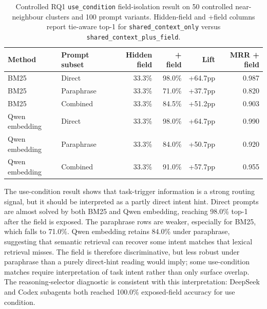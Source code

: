 \begin{table}[H]
\centering
\scriptsize
\setlength{\tabcolsep}{2pt}
\begin{tabular}{p{}p{}rrrr}
\toprule
Method & Prompt subset & Hidden field & + field & Lift & MRR + field \\
\midrule
BM25 & Direct & 33.3\% & 98.0\% & +64.7pp & 0.987 \\
BM25 & Paraphrase & 33.3\% & 71.0\% & +37.7pp & 0.820 \\
BM25 & Combined & 33.3\% & 84.5\% & +51.2pp & 0.903 \\
Qwen embedding & Direct & 33.3\% & 98.0\% & +64.7pp & 0.990 \\
Qwen embedding & Paraphrase & 33.3\% & 84.0\% & +50.7pp & 0.920 \\
Qwen embedding & Combined & 33.3\% & 91.0\% & +57.7pp & 0.955 \\
\bottomrule
\end{tabular}
\caption{Controlled RQ1 \texttt{use\_condition} field-isolation result on 50 controlled near-neighbour clusters and 100 prompt variants. Hidden-field and +field columns report tie-aware top-1 for \texttt{shared\_context\_only} versus \texttt{shared\_context\_plus\_field}.}
\label{tab:rq1a-use-condition-isolation}
\end{table}

The use-condition result shows that task-trigger information is a strong routing signal, but it should be interpreted as a partly direct intent hint. Direct prompts are almost solved by both BM25 and Qwen embedding, reaching 98.0\% top-1 after the field is exposed. The paraphrase rows are weaker, especially for BM25, which falls to 71.0\%. Qwen embedding retains 84.0\% under paraphrase, suggesting that semantic retrieval can recover some intent matches that lexical retrieval misses. The field is therefore discriminative, but less robust under paraphrase than a purely direct-hint reading would imply; some use-condition matches require interpretation of task intent rather than only surface overlap. The reasoning-selector diagnostic is consistent with this interpretation: DeepSeek and Codex subagents both reached 100.0\% exposed-field accuracy for use condition.

